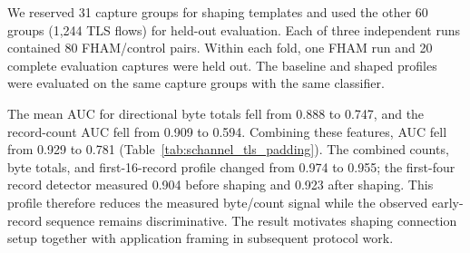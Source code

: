 \documentclass[preprint,12pt]{elsarticle}
\theoremstyle{plain}
\begin{document}
We reserved 31 capture groups for shaping templates and used the other 60
groups (1,244 TLS flows) for held-out evaluation. Each of three independent
runs contained 80 FHAM/control pairs. Within each fold, one FHAM run and 20
complete evaluation captures were held out. The baseline and shaped profiles
were evaluated on the same capture groups with the same classifier.

The mean AUC for directional byte totals fell from 0.888 to 0.747, and the
record-count AUC fell from 0.909 to 0.594. Combining these features, AUC fell
from 0.929 to 0.781 (Table~\ref{tab:schannel_tls_padding}). The combined
counts, byte totals, and first-16-record profile changed from 0.974 to 0.955; the first-four
record detector measured 0.904 before shaping and 0.923 after shaping. This
profile therefore reduces the measured byte/count signal while the observed
early-record sequence remains discriminative. The result motivates shaping
connection setup together with application framing in subsequent protocol
work.

\begin{table}[H]
\centering
\scriptsize
\setlength{\tabcolsep}{3pt}
\caption{Mean held-out AUC for Schannel TLS~1.2 profiles against the same 60-capture evaluation set.}
\label{tab:schannel_tls_padding}

\end{table}
\end{document}
